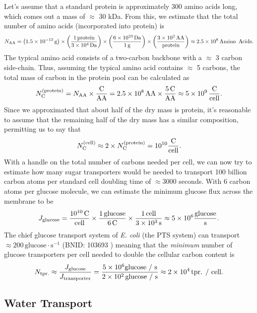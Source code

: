 Let's assume that a standard protein is approximately 300 amino acids long,
which comes out a mass of $\approx$ 30 kDa. From this, we estimate that the
total number of amino acids (incorporated into protein) is
\begin{equation}
    N_\text{AA} = \left(1.5 \times 10^{-13}\,\text{g}\right) \times
\left({1\,\text{protein} \over 3 \times 10^4\, \text{Da}}\right) \times
\left( {6 \times 10^{23}\,\text{Da} \over 1\,\text{g}}\right) \times \left({3
\times 10^2 \,\text{AA} \over \text{protein}}\right) \approx 2.5 \times
10^8\,\text{Amino\, Acids}. 
\label{eq:num_amino_acids}
\end{equation}
The typical amino acid consists of a two-carbon backbone with a $\approx$ 3
carbon side-chain. Thus, assuming the typical amino acid contains $\approx$ 5
carbons, the total mass of carbon in the protein pool can be calculated as
\begin{equation}
    N_\text{C}^\text{(protein)} = N_\text{AA} \times {\text{C} \over \text{AA}}
= 2.5 \times 10^8\, \text{AA} \times {5\, \text{C} \over \text{AA}} \approx 5
\times 10^9\, {\text{C} \over \text{cell}}. 
\label{eq:n_carbon_protein}
\end{equation}
Since we approximated that about half of the dry mass is protein, it's
reasonable to assume that the remaining half of the dry mass has a similar
composition, permitting us to say that
\begin{equation}
N_\text{C}^{\text{(cell)}} \approx 2 \times N_\text{C}^\text{(protein)} =
10^{10} {\text{C} \over \text{cell}}. 
\label{eq:n_carbon_cell}
\end{equation}
With a handle on the total number of carbons needed per cell, we can now try
to estimate how many sugar transporters would be needed to transport 100
billion carbon atoms per standard cell doubling time of $\approx 3000$ seconds. With 6
carbon atoms per glucose molecule, we can estimate the minimum glucose flux
across the membrane to be
\begin{equation}
J_\text{glucose} = {10^{10}\,\text{C} \over \text{cell}} \times {1\,
\text{glucose} \over 6\, \text{C}} \times {1\,\text{cell} \over 3 \times
10^3\,\text{s}} \approx 5 \times 10^6 {\text{glucose} \over \text{s}}.
\label{eq:glucose_flux}
\end{equation}
The chief glucose transport system of \textit{E. coli} (the PTS system) can 
transport $\approx 200\, \text{glucose}\cdot\text{s}^{-1}$ (BNID: 103693 \cite{milo2010})
meaning that the \textit{minimum} number of glucose transporters per cell needed 
to double the cellular carbon content is
\begin{equation}
N_\text{tpr.} \approx {J_\text{glucose} \over J_\text{transporter}} = {5
\times 10^6 \text{glucose / s} \over 2 \times 10^2 \,\text{glucose / s}}
\approx 2 \times 10^4\, \text{tpr. / cell}.
\label{eq:n_gluc_transporters}
\end{equation}




\subsection{Water Transport}